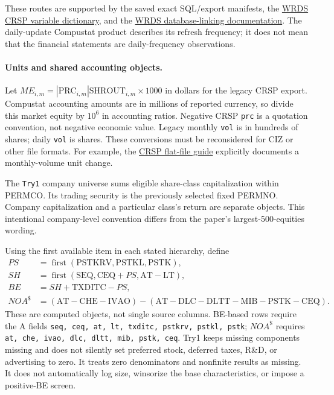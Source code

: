 \documentclass[11pt]{article}
\begin{document}
These routes are supported by the saved exact SQL/export manifests, the \href{https://wrds-www.wharton.upenn.edu/demo/crsp/form/}{WRDS CRSP variable dictionary}, and the \href{https://wrds-www.wharton.upenn.edu/pages/wrds-research/database-linking-matrix/database-linking-tool/}{WRDS database-linking documentation}. The daily-update Compustat product describes its refresh frequency; it does not mean that the financial statements are daily-frequency observations.

\paragraph{Units and shared accounting objects.}
Let $ME_{i,m}=|\mathrm{PRC}_{i,m}|\mathrm{SHROUT}_{i,m}\times1000$ in dollars for the legacy CRSP export. Compustat accounting amounts are in millions of reported currency, so divide this market equity by $10^6$ in accounting ratios. Negative CRSP \texttt{prc} is a quotation convention, not negative economic value. Legacy monthly \texttt{vol} is in hundreds of shares; daily \texttt{vol} is shares. These conversions must be reconsidered for CIZ or other file formats. For example, the \href{https://www.crsp.org/wp-content/uploads/guides/CRSP_US_Stock_\%26_Indexes_Database_Guide_Flat_File_Format_1.0.pdf}{CRSP flat-file guide} explicitly documents a monthly-volume unit change.

The \texttt{Try1} company universe sums eligible share-class capitalization within PERMCO. Its trading security is the previously selected fixed PERMNO. Company capitalization and a particular class's return are separate objects. This intentional company-level convention differs from the paper's largest-500-equities wording.

Using the first available item in each stated hierarchy, define
\begin{align*}
PS &= \operatorname{first}(\mathrm{PSTKRV},\mathrm{PSTKL},\mathrm{PSTK}),\\
SH &= \operatorname{first}(\mathrm{SEQ},\mathrm{CEQ}+PS,\mathrm{AT}-\mathrm{LT}),\\
BE &= SH+\mathrm{TXDITC}-PS,\\
NOA^{\$} &= (\mathrm{AT}-\mathrm{CHE}-\mathrm{IVAO})
 -(\mathrm{AT}-\mathrm{DLC}-\mathrm{DLTT}-\mathrm{MIB}-\mathrm{PSTK}-\mathrm{CEQ}).
\end{align*}
These are computed objects, not single source columns. BE-based rows require the A fields \texttt{seq, ceq, at, lt, txditc, pstkrv, pstkl, pstk}; $NOA^{\$}$ requires \texttt{at, che, ivao, dlc, dltt, mib, pstk, ceq}. Try1 keeps missing components missing and does not silently set preferred stock, deferred taxes, R\&D, or advertising to zero. It treats zero denominators and nonfinite results as missing. It does not automatically log size, winsorize the base characteristics, or impose a positive-BE screen.
\end{document}
